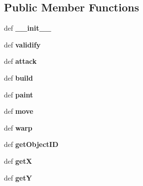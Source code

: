\subsection*{Public Member Functions}
\begin{CompactItemize}
\item 
\hypertarget{classGameObject_1_1Unit_29efd7d8ec0ee55b4cfd2a198c42eab5}{
def \textbf{\_\-\_\-init\_\-\_\-}}
\label{classGameObject_1_1Unit_29efd7d8ec0ee55b4cfd2a198c42eab5}

\item 
\hypertarget{classGameObject_1_1Unit_cab27f353a1f56aa6bb1917fd44e59d6}{
def \textbf{validify}}
\label{classGameObject_1_1Unit_cab27f353a1f56aa6bb1917fd44e59d6}

\item 
\hypertarget{classGameObject_1_1Unit_d6ddcef565e5b43deb573300a6cb2b20}{
def \textbf{attack}}
\label{classGameObject_1_1Unit_d6ddcef565e5b43deb573300a6cb2b20}

\item 
\hypertarget{classGameObject_1_1Unit_f067f326af32e3998d449261bc8f23b7}{
def \textbf{build}}
\label{classGameObject_1_1Unit_f067f326af32e3998d449261bc8f23b7}

\item 
\hypertarget{classGameObject_1_1Unit_0875c2b42551b29aaac2964d01196043}{
def \textbf{paint}}
\label{classGameObject_1_1Unit_0875c2b42551b29aaac2964d01196043}

\item 
\hypertarget{classGameObject_1_1Unit_ba05fa00dd08f1344d5ecea04d1633d3}{
def \textbf{move}}
\label{classGameObject_1_1Unit_ba05fa00dd08f1344d5ecea04d1633d3}

\item 
\hypertarget{classGameObject_1_1Unit_e6bb30c8a2f3c1adf9b1c466b712c8ea}{
def \textbf{warp}}
\label{classGameObject_1_1Unit_e6bb30c8a2f3c1adf9b1c466b712c8ea}

\item 
\hypertarget{classGameObject_1_1Unit_14825583af290dbd3303a7655e63a1cd}{
def \textbf{getObjectID}}
\label{classGameObject_1_1Unit_14825583af290dbd3303a7655e63a1cd}

\item 
\hypertarget{classGameObject_1_1Unit_01711efd87c7e3e2a97066e9a5c50da5}{
def \textbf{getX}}
\label{classGameObject_1_1Unit_01711efd87c7e3e2a97066e9a5c50da5}

\item 
\hypertarget{classGameObject_1_1Unit_4d0c47deb0ddb19b9e2b195d8ca2f2ad}{
def \textbf{getY}}
\label{classGameObject_1_1Unit_4d0c47deb0ddb19b9e2b195d8ca2f2ad}


\end{CompactItemize}
